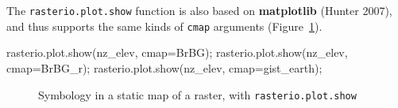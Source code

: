 \documentclass[
  letterpaper,
]{krantz}
\newenvironment{Shaded}{\begin{snugshade}}{\end{snugshade}}
\newcommand{\NormalTok}[1]{\textcolor[rgb]{0.00,0.23,0.31}{#1}}
\newcommand{\OperatorTok}[1]{\textcolor[rgb]{0.37,0.37,0.37}{#1}}
\newcommand{\StringTok}[1]{\textcolor[rgb]{0.13,0.47,0.30}{#1}}
\begin{document}
The \texttt{rasterio.plot.show} function is also based on
\textbf{matplotlib} (Hunter 2007), and thus supports the same kinds of
\texttt{cmap} arguments (Figure~\ref{fig-plot-symbology-colors-r}).

\begin{Shaded}
\begin{Highlighting}[]
\NormalTok{rasterio.plot.show(nz\_elev, cmap}\OperatorTok{=}\StringTok{\textquotesingle{}BrBG\textquotesingle{}}\NormalTok{)}\OperatorTok{;}
\NormalTok{rasterio.plot.show(nz\_elev, cmap}\OperatorTok{=}\StringTok{\textquotesingle{}BrBG\_r\textquotesingle{}}\NormalTok{)}\OperatorTok{;}
\NormalTok{rasterio.plot.show(nz\_elev, cmap}\OperatorTok{=}\StringTok{\textquotesingle{}gist\_earth\textquotesingle{}}\NormalTok{)}\OperatorTok{;}
\end{Highlighting}
\end{Shaded}

\begin{figure}

\begin{minipage}{0.33\linewidth}



\end{minipage}%
%
\begin{minipage}{0.33\linewidth}



\end{minipage}%
%
\begin{minipage}{0.33\linewidth}



\end{minipage}%

\caption{\label{fig-plot-symbology-colors-r}Symbology in a static map of
a raster, with \texttt{rasterio.plot.show}}

\end{figure}%
\end{document}
